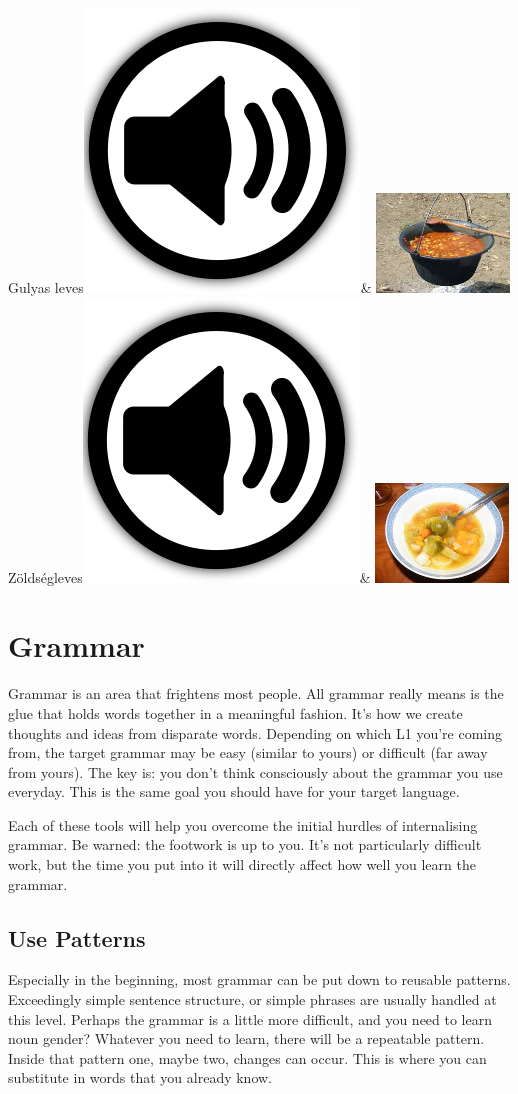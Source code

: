 \documentclass[letterpaper,twoside,openright,11pt,final]{memoir}
\newcommand{\smallimage}{100pt}
\newcommand{\audio}{{\includegraphics[scale=0.05]{audio}}}
\begin{document}
{\begin{longtabu}
Gulyas leves\audio{}& \includegraphics[width=\smallimage]{./images/gulyasleves}\\
Zöldségleves\audio{}& \includegraphics[width=\smallimage]{./images/zoldsegleves}\\
\end{longtabu}
}
\chapter{Grammar}

Grammar is an area that frightens most people. All grammar really means is the glue that holds words together in a meaningful fashion. It's how we create thoughts and ideas from disparate words. Depending on which L1 you're coming from, the target grammar may be easy (similar to yours) or difficult (far away from yours). The key is: you don't think consciously about the grammar you use everyday. This is the same goal you should have for your target language.

Each of these tools will help you overcome the initial hurdles of internalising grammar. Be warned: the footwork is up to you. It's not particularly difficult work, but the time you put into it will directly affect how well you learn the grammar.

\section{Use Patterns}

Especially in the beginning, most grammar can be put down to reusable patterns. Exceedingly simple sentence structure, or simple phrases are usually handled at this level. Perhaps the grammar is a little more difficult, and you need to learn noun gender? Whatever you need to learn, there will be a repeatable pattern. Inside that pattern one, maybe two, changes can occur. This is where you can substitute in words that you already know. 
\end{document}
